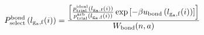 \documentclass[12pt]{article}
\begin{document}
\begin{displaymath}
P_{\rm select}^{\rm bond}\left(l_{\rm g_a,f}(i)\right) = 
{{
\left[
{{p_{\rm trial}^{\rm ideal}\left(l_{\rm g_a,f}(i)\right)}\over{ p_{\rm trial}^{\rm arb}\left(l_{\rm g_a,f}(i)\right)}}
\exp\left[-\beta u_{\rm bond}\left(l_{\rm g_a,f}(i)\right)\right]
\right]
}
\over
{
W_{\rm bond}(n,a)
}}
\end{displaymath}
\end{document}
